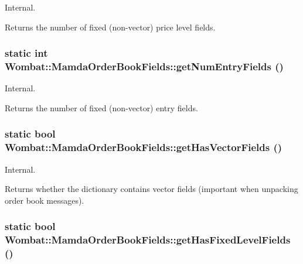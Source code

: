 Internal. 

Returns the number of fixed (non-vector) price level fields. \hypertarget{classWombat_1_1MamdaOrderBookFields_f409d69017eeecc76221e1dfb4f75ffe}{
\subsubsection[getNumEntryFields]{\setlength{\rightskip}{0pt plus 5cm}static int Wombat::Mamda\-Order\-Book\-Fields::get\-Num\-Entry\-Fields ()}}
\label{classWombat_1_1MamdaOrderBookFields_f409d69017eeecc76221e1dfb4f75ffe}


Internal. 

Returns the number of fixed (non-vector) entry fields. \hypertarget{classWombat_1_1MamdaOrderBookFields_cbae2a4519faa1c9dbe8a6d2694d3618}{
\subsubsection[getHasVectorFields]{\setlength{\rightskip}{0pt plus 5cm}static bool Wombat::Mamda\-Order\-Book\-Fields::get\-Has\-Vector\-Fields ()}}
\label{classWombat_1_1MamdaOrderBookFields_cbae2a4519faa1c9dbe8a6d2694d3618}


Internal. 

Returns whether the dictionary contains vector fields (important when unpacking order book messages). \hypertarget{classWombat_1_1MamdaOrderBookFields_d3ed0b8d3b8d4f3c0f13ce9b4ca378b5}{
\subsubsection[getHasFixedLevelFields]{\setlength{\rightskip}{0pt plus 5cm}static bool Wombat::Mamda\-Order\-Book\-Fields::get\-Has\-Fixed\-Level\-Fields ()}}
\label{classWombat_1_1MamdaOrderBookFields_d3ed0b8d3b8d4f3c0f13ce9b4ca378b5}


